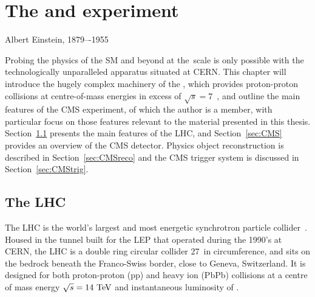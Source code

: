
\chapter{The \LHC and \CMS experiment}
\label{chap:detector}

{Albert Einstein, 1879–-1955}

Probing the physics of the \ac{SM} and beyond at the~\TeV scale is only possible with the technologically unparalleled apparatus situated at \ac{CERN}.
This chapter will introduce the hugely complex machinery of the \LHC, 
which provides proton-proton collisions at centre-of-mass energies in excess of $\sqrt{s}=7$~\TeV, 
and outline the main features of the \ac{CMS} experiment, of which the author is a member, 
with particular focus on those features relevant to the material presented in this thesis.
%
Section~\ref{sec:LHC} presents the main features of the \ac{LHC}, and Section~\ref{sec:CMS} provides an overview of the \ac{CMS} detector. Physics object reconstruction is described in Section~\ref{sec:CMSreco} and the \ac{CMS} trigger system is discussed in Section~\ref{sec:CMStrig}. 

%                                                                  

\section{The \ac{LHC}}
\label{sec:LHC}
The \ac{LHC} is the world's largest and most energetic synchrotron particle collider~\cite{bib:LHC}. 
Housed in the tunnel built for the \ac{LEP} that operated during the 1990's at \ac{CERN}, 
the \ac{LHC} is a double ring circular collider 27~\km in circumference, 
and sits on the bedrock beneath the Franco-Swiss border, close to Geneva, Switzerland. 
It is designed for both proton-proton (pp) and heavy ion (PbPb) collisions at a centre of mass energy $\sqrt{s} = 14~\mathrm{TeV}$ and instantaneous luminosity of \designLumi.


